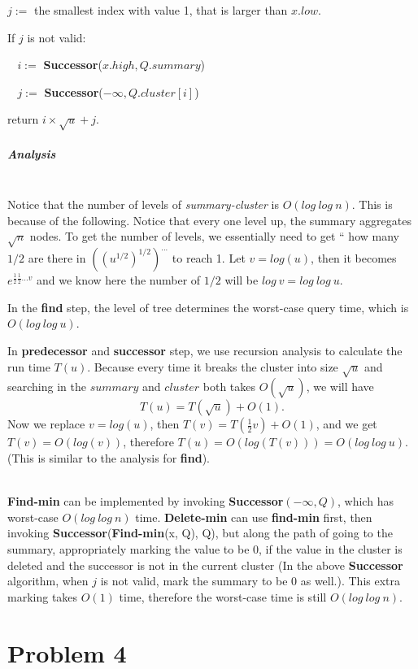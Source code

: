 \documentclass[12pt]{article}
\begin{document}
$j:=$ the smallest index with value 1, that is larger than $x.low$. 

If $j$ is not valid: 

$\:\:\:\:i:= $ \textbf{Successor}($x.high, Q.summary$)

$\:\:\:\:j:= $ \textbf{Successor}($-\infty, Q.cluster[i]$)

return $i \times \sqrt{u} + j$.
~\\

\subparagraph{Analysis} 
~\\

Notice that the number of levels of \emph{summary-cluster} is $O(log\:log\:n)$. This is because of the following. Notice that every one level up, the summary aggregates $\sqrt{n}$ nodes. To get the number of levels, we essentially need to get `` how many $1/2$ are there in $((u^{1/2})^{1/2})^{...}$ to reach 1. Let $v = log(u)$, then it becomes $e^{\frac{1}{2}\frac{1}{2}...v}$ and we know here the number of $1/2$ will be $log\:v = log\:log\:u$.

In the \textbf{find} step, the level of tree determines the worst-case query time, which is $O(log\:log\:u)$.

In \textbf{predecessor} and \textbf{successor} step, we use recursion analysis to calculate the run time $T(u)$. Because every time it breaks the cluster into size $\sqrt{u}$ and searching in the $summary$ and $cluster$ both takes $O(\sqrt{u})$, we will have 
$$ T(u) = T(\sqrt{u}) + O(1).$$ Now we replace $v = log(u)$, then $ T(v) = T(\frac{1}{2}v) + O(1)$, and we get $T(v) = O(log(v))$, therefore $T(u) = O(log(T(v))) = O(log\:log\:u)$. (This is similar to the analysis for \textbf{find}).

~\\

\textbf{Find-min} can be implemented by invoking \textbf{Successor}$(-\infty, Q)$, which has worst-case $O(log\:log\:n)$ time. \textbf{Delete-min} can use \textbf{find-min} first, then invoking \textbf{Successor}(\textbf{Find-min}(x, Q), Q), but along the path of going to the summary, appropriately marking the value to be 0, if the value in the cluster is deleted and the successor is not in the current cluster (In the above \textbf{Successor} algorithm, when $j$ is not valid, mark the summary to be $0$ as well.). This extra marking takes $O(1)$ time, therefore the worst-case time is still $O(log\:log\:n)$.

\pagebreak

\section*{Problem 4}
\end{document}

